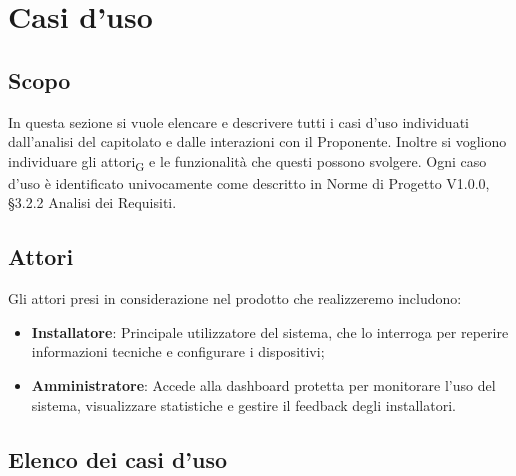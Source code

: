 \section{Casi d'uso}
\subsection{Scopo}
In questa sezione si vuole elencare e descrivere tutti i casi d'uso individuati dall'analisi del capitolato e dalle interazioni con il Proponente. Inoltre si vogliono individuare gli attori\textsubscript{G} e le funzionalità che questi possono svolgere. Ogni caso d'uso è identificato univocamente come descritto in Norme di Progetto V1.0.0,  §3.2.2 Analisi dei Requisiti.

\subsection{Attori}
Gli attori presi in considerazione nel prodotto che realizzeremo includono:
\begin{itemize}
    \item \textbf{Installatore}: Principale utilizzatore del sistema, che lo interroga per reperire informazioni tecniche e configurare i dispositivi; 
    \item \textbf{Amministratore}: Accede alla dashboard protetta per monitorare l’uso del sistema, visualizzare statistiche e gestire il feedback degli installatori.
\end{itemize}

\subsection{Elenco dei casi d'uso}
